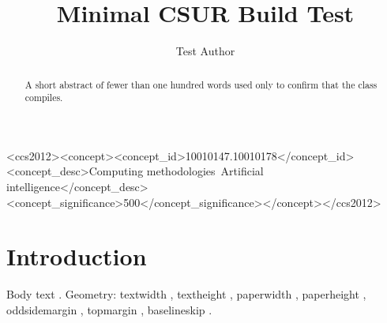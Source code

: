 \documentclass[acmsmall]{acmart}
\begin{document}
\title{Minimal CSUR Build Test}
\author{Test Author}
\begin{abstract}
A short abstract of fewer than one hundred words used only to confirm that the class compiles.
\end{abstract}
\begin{CCSXML}
<ccs2012><concept><concept_id>10010147.10010178</concept_id><concept_desc>Computing methodologies~Artificial intelligence</concept_desc><concept_significance>500</concept_significance></concept></ccs2012>
\end{CCSXML}
\maketitle
\section{Introduction}
Body text \cite{knuth84}. Geometry: textwidth \the\textwidth, textheight \the\textheight, paperwidth \the\paperwidth, paperheight \the\paperheight, oddsidemargin \the\oddsidemargin, topmargin \the\topmargin, baselineskip \the\baselineskip.


\end{document}
